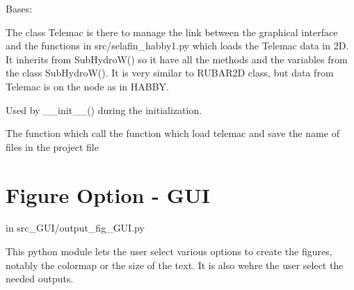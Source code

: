 \documentclass[letterpaper,10pt,english]{sphinxmanual}
\begin{document}
\begin{fulllineitems}
\label{\detokenize{index:src_GUI.hydro_GUI_2.TELEMAC}}
Bases: {\hyperref[\detokenize{index:src_GUI.hydro_GUI_2.SubHydroW}]{}}

The class Telemac is there to manage the link between the graphical interface and the functions in src/selafin\_habby1.py
which loads the Telemac data in 2D. It inherits from SubHydroW() so it have all the methods and the variables
from the class SubHydroW(). It is very similar to RUBAR2D class, but data from Telemac is on the node as in HABBY.

\begin{fulllineitems}
\label{\detokenize{index:src_GUI.hydro_GUI_2.TELEMAC.init_iu}}
Used by \_\_init\_\_() during the initialization.

\end{fulllineitems}


\begin{fulllineitems}
\label{\detokenize{index:src_GUI.hydro_GUI_2.TELEMAC.load_telemac_gui}}
The function which call the function which load telemac and save the name of files in the project file

\end{fulllineitems}


\end{fulllineitems}



\section{Figure Option - GUI}
\label{\detokenize{index:figure-option-gui}}
in src\_GUI/output\_fig\_GUI.py

This python module lets the user select various options to create the figures, notably the colormap or the size of the text.
It is also wehre the user select the needed outputs.
\label{\detokenize{index:module-src_GUI.output_fig_GUI}}
\end{document}
